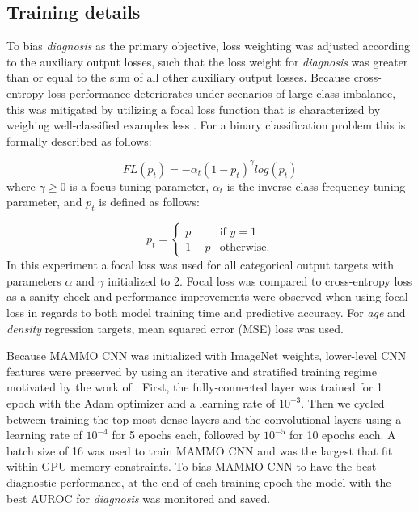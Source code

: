 \documentclass[journal]{IEEEtran}
\begin{document}
\subsection{Training details}

To bias \textit{diagnosis} as the primary objective, loss weighting was adjusted according to the auxiliary output losses, such that the loss weight for \textit{diagnosis} was greater than or equal to the sum of all other auxiliary output losses.  Because cross-entropy loss performance deteriorates under scenarios of large class imbalance, this was mitigated by utilizing a focal loss function that is characterized by weighing well-classified examples less \cite{focalloss-2017}.  For a binary classification problem this is formally described as follows: 

\begin{equation} \label{eq:focal_loss}
{FL}(p_t) = -\alpha_t(1-p_t)^\gamma log(p_t)
\end{equation}
where $\gamma \geq 0$ is a focus tuning parameter, $\alpha_t$ is the inverse class frequency tuning parameter, and $p_t$ is defined as follows: 

\begin{equation} \label{eq:pt}
p_t = \begin{cases}
p &\text{if $y=1$}
\\
1-p &\text{otherwise.}
\end{cases}
\end{equation}
In this experiment a focal loss was used for all categorical output targets with parameters $\alpha$ and $\gamma$ initialized to 2. 
Focal loss was compared to cross-entropy loss as a sanity check and performance improvements were observed when using focal loss in regards to both model training time and predictive accuracy.  For  \textit{age} and \textit{density} regression targets, mean squared error (MSE) loss was used.  

Because MAMMO CNN was initialized with ImageNet weights, lower-level CNN features were preserved by using an iterative and stratified training regime motivated by the work of \cite{shen-2017}.  First, the fully-connected layer was trained for 1 epoch with the Adam optimizer and a learning rate of $10^{-3}$.  
Then we cycled between training the top-most dense layers and the convolutional layers using a learning rate of $10^{-4}$ for 5 epochs each, followed by $10^{-5}$ for 10 epochs each.
A batch size of 16 was used to train MAMMO CNN and was the largest that fit within GPU memory constraints.  To bias MAMMO CNN to have the best diagnostic performance, at the end of each training epoch the model with the best AUROC for \textit{diagnosis} was monitored  and saved.
\end{document}
